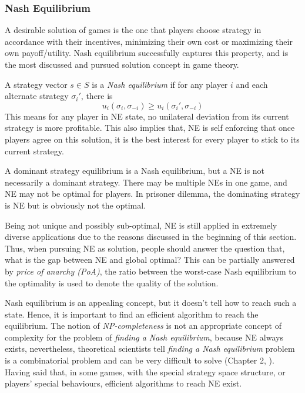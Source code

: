 \subsubsection{Nash Equilibrium}
A desirable solution of games is the one that players choose strategy in accordance with their incentives, minimizing their own cost or maximizing their own payoff/utility.
Nash equilibrium successfully captures this property, and is the most discussed and pursued solution concept in game theory.

A strategy vector $s\in S$ is a \textit{Nash equilibrium} if for any player $i$ and each alternate strategy $\sigma_i'$, there is
 \[ u_i(\sigma_i, \sigma_{-i}) \geq u_i(\sigma_i', \sigma_{-i})\]
This means for any player in NE state, no unilateral deviation from its current strategy is more profitable.
This also implies that, NE is self enforcing that once players agree on this solution, it is the best interest for every player to stick to its current strategy.

A dominant strategy equilibrium is a Nash equilibrium, but a NE is not necessarily a dominant strategy.
There may be multiple NEs in one game, and NE may not be optimal for players. 
In prisoner dilemma, the dominating strategy is NE but is obviously not the optimal.


Being not unique and possibly sub-optimal, NE is still applied in extremely diverse applications due to the reasons discussed in the beginning of this section.
Thus, when pursuing NE as solution, people should answer the question that, what is the gap between NE and global optimal?
This can be partially answered by \textit{price of anarchy (\gls{PoA})}, the ratio between the worst-case Nash equilibrium to the optimality is used to denote the quality of the solution.

Nash equilibrium is an appealing concept, but it doesn't tell how to reach such a state.
Hence, it is important to find an efficient algorithm to reach the equilibrium.
The notion of \textit{NP-completeness} is not an appropriate concept of complexity for the problem of \textit{finding a Nash equilibrium}, because NE always exists, nevertheless, theoretical scientists tell \textit{finding a Nash equilibrium} problem is a combinatorial problem and can be very difficult to solve (Chapter 2, \cite{agt_book}).
Having said that, in some games, with the special strategy space structure, or players' special behaviours, efficient algorithms to reach NE exist.





